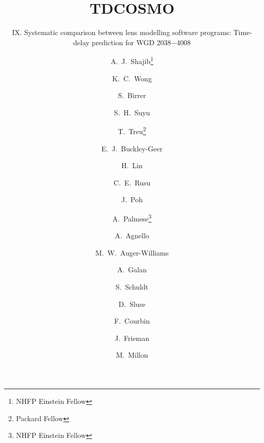 \documentclass[longauth]{aa}
\newcommand{\lensname}{WGD 2038$-$4008}
\newcommand{\ajs}[1]{{{#1}}}
\begin{document}
 

   \title{TDCOSMO}

   \subtitle{IX. Systematic comparison between lens modelling \ajs{software programs}: Time-delay prediction for \lensname}
        

   \author{A.~J.~Shajib\inst{\ref{inst1}, \ref{inst2}, \ref{inst3}}\fnmsep\thanks{NHFP Einstein Fellow}
          \and K.~C.~Wong\inst{\ref{inst4}, \ref{inst5}}
          \and S.~Birrer\inst{\ref{inst6}, \ref{inst7}}
          \and S.~H.~Suyu\inst{\ref{inst8}, \ref{inst9}, \ref{inst10}}
          \and T.~Treu\inst{\ref{inst3}}\fnmsep\thanks{Packard Fellow}
          \and E.~J.~Buckley-Geer\inst{\ref{inst11}, \ref{inst1}}
          \and H.~Lin\inst{\ref{inst11}}
          \and C.~E.~Rusu\inst{\ref{inst4}}
          \and J.~Poh\inst{\ref{inst1}, \ref{inst2}}
          \and A.~Palmese\inst{\ref{inst12},\ref{inst11}}\fnmsep\thanks{NHFP Einstein Fellow}
          \and A.~Agnello\inst{\ref{inst13}}
          \and M.~W.~Auger-Williams\inst{\ref{inst14}, \ref{inst15}}
          \and A.~Galan\inst{\ref{inst16}}
          \and S.~Schuldt\inst{\ref{inst8}, \ref{inst9}}
          \and D.~Sluse\inst{\ref{inst17}}
          \and F.~Courbin\inst{\ref{inst16}}
          \and J.~Frieman\inst{\ref{inst1}, \ref{inst2}, \ref{inst11}}
          \and M.~Millon\inst{\ref{inst16}}
          }
\end{document}
